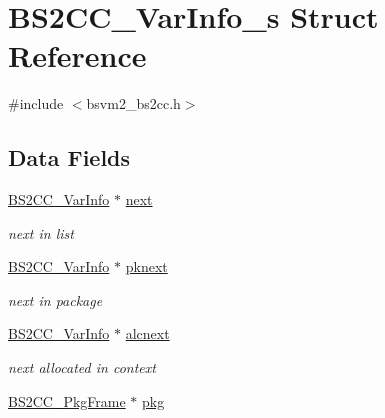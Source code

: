 \hypertarget{structBS2CC__VarInfo__s}{\section{B\-S2\-C\-C\-\_\-\-Var\-Info\-\_\-s Struct Reference}
\label{structBS2CC__VarInfo__s}
}


{\ttfamily \#include $<$bsvm2\-\_\-bs2cc.\-h$>$}

\subsection*{Data Fields}
\begin{DoxyCompactItemize}
\item 
\hypertarget{structBS2CC__VarInfo__s_a028b83b21a6c441bd88328947fc6069b}{\hyperlink{structBS2CC__VarInfo__s}{B\-S2\-C\-C\-\_\-\-Var\-Info} $\ast$ \hyperlink{structBS2CC__VarInfo__s_a028b83b21a6c441bd88328947fc6069b}{next}}\label{structBS2CC__VarInfo__s_a028b83b21a6c441bd88328947fc6069b}

\begin{DoxyCompactList}\small\item\em next in list \end{DoxyCompactList}\item 
\hypertarget{structBS2CC__VarInfo__s_a15b651d65046720939e10f904db711d3}{\hyperlink{structBS2CC__VarInfo__s}{B\-S2\-C\-C\-\_\-\-Var\-Info} $\ast$ \hyperlink{structBS2CC__VarInfo__s_a15b651d65046720939e10f904db711d3}{pknext}}\label{structBS2CC__VarInfo__s_a15b651d65046720939e10f904db711d3}

\begin{DoxyCompactList}\small\item\em next in package \end{DoxyCompactList}\item 
\hypertarget{structBS2CC__VarInfo__s_aaba6f34540f371489a2e0c750de05974}{\hyperlink{structBS2CC__VarInfo__s}{B\-S2\-C\-C\-\_\-\-Var\-Info} $\ast$ \hyperlink{structBS2CC__VarInfo__s_aaba6f34540f371489a2e0c750de05974}{alcnext}}\label{structBS2CC__VarInfo__s_aaba6f34540f371489a2e0c750de05974}

\begin{DoxyCompactList}\small\item\em next allocated in context \end{DoxyCompactList}\item 
\hypertarget{structBS2CC__VarInfo__s_a76333823373ec3e630e4cd2f8fea4d08}{\hyperlink{structBS2CC__PkgFrame__s}{B\-S2\-C\-C\-\_\-\-Pkg\-Frame} $\ast$ \hyperlink{structBS2CC__VarInfo__s_a76333823373ec3e630e4cd2f8fea4d08}{pkg}}\label{structBS2CC__VarInfo__s_a76333823373ec3e630e4cd2f8fea4d08}


\end{DoxyCompactItemize}
